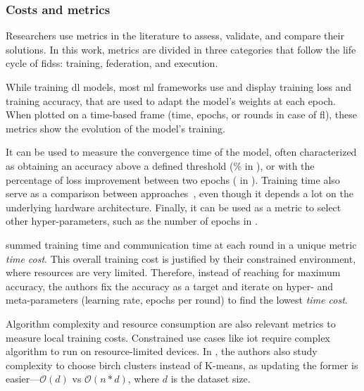 
\subsubsection{Costs and metrics}
\label{sec:sota.quali.metrics}

Researchers use metrics in the literature to assess, validate, and compare their solutions.
In this work, metrics are divided in three categories that follow the life cycle of \glspl{fids}: training, federation, and execution.

While training \gls{dl} models, most \gls{ml} frameworks use and display training loss and training accuracy, that are used to adapt the model's weights at each epoch.
When plotted on a time-based frame (time, epochs, or rounds in case of \gls{fl}), these metrics show the evolution of the model's training.



It can be used to measure the convergence time of the model, often characterized as obtaining an accuracy above a defined threshold (\% in \cite{chen_Networkanomalydetection_2020b}), or with the percentage of loss improvement between two epochs ( in \cite{kim_CollaborativeAnomalyDetection_2020}). Training time also serve as a comparison between approaches~\cite{schneble_Attackdetectionusing_2019}, even though it depends a lot on the underlying hardware architecture. Finally, it can be used as a metric to select other hyper-parameters, such as the number of epochs in \cite{liu_BlockchainFederatedLearning_2021}.

\textcite{li_DeepFedFederatedDeep_2020b} summed training time and communication time at each round in a unique metric \emph{time cost}.
This overall training cost is justified by their constrained environment, where resources are very limited.
Therefore, instead of reaching for maximum accuracy, the authors fix the accuracy as a target and iterate on hyper- and meta-parameters (\eg learning rate, epochs per round) to find the lowest \emph{time cost}.


Algorithm complexity and resource consumption are also relevant metrics to measure local training costs.
Constrained use cases like \gls{iot} require complex algorithm to run on resource-limited devices.
In \cite{pahl_AllEyesYou_2018}, the authors also study complexity to choose \gls{birch} clusters instead of K-means, as updating the former is easier---\(\mathcal{O}(d)\) vs \(\mathcal{O}(n*d)\), where \(d\) is the dataset size.

